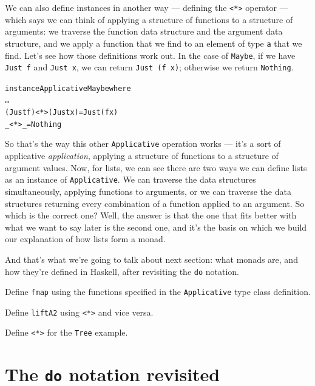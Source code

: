 We can also define instances in another way — defining the \texttt{<*>} operator — which says we can think of applying a structure of functions to a structure of arguments: we traverse the function data structure and the argument data structure, and we apply a function that we find to an element of type \texttt{a} that we find. Let's see how those definitions work out. In the case of \texttt{Maybe}, if we have \texttt{Just f} and \texttt{Just x}, we can return \texttt{Just (f x)}; otherwise we return \texttt{Nothing}. 
\begin{alltt}
instance Applicative Maybe where
  …
  (Just f) <*> (Just x) = Just (f x)
  _ <*> _ = Nothing
\end{alltt}
So that's the way this other \texttt{Applicative} operation works — it's a sort of applicative \emph{application}, applying a structure of functions to a structure of argument values. Now, for lists, we can see there are two ways we can define lists as an instance of \texttt{Applicative}. We can traverse the data structures simultaneously, applying functions to arguments, or we can traverse the data structures returning every combination of a function applied to an argument. So which is the correct one? Well, the answer is that the one that fits better with what we want to say later is the second one, and it's the basis on which we build our explanation of how lists form a monad.

And that's what we're going to talk about next section: what monads are, and how they're defined in Haskell, after revisiting the \texttt{do} notation.

\begin{exercises}
 

\item
Define \texttt{fmap} using the functions specified in the \texttt{Applicative} type class definition.

\item
Define \texttt{liftA2} using \texttt{<*>} and vice versa.

\item
Define \texttt{<*>} for the \texttt{Tree} example.

\end{exercises}



\section{The \texttt{do} notation revisited}

